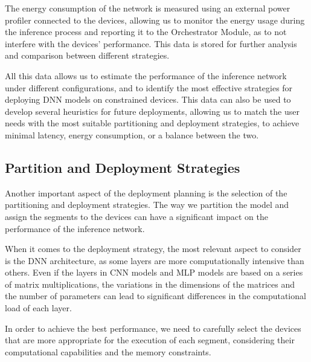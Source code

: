 The energy consumption of the network is measured using an external power profiler 
connected to the devices, allowing us to monitor the energy usage during the inference 
process and reporting it to the Orchestrator Module, as
to not interfere with the devices' performance. This data is stored for further 
analysis and comparison between different strategies.

All this data allows us to estimate the performance of the inference network under
different configurations, and to identify the most effective strategies for deploying
\ac{DNN} models on constrained devices. This data can also be used to develop several 
heuristics for future deployments, allowing us to match the user needs with the most
suitable partitioning and deployment strategies, to achieve minimal latency, energy
consumption, or a balance between the two. 


\subsection{Partition and Deployment Strategies}\label{sec:se453}


Another important aspect of the deployment planning is the selection of the
partitioning and deployment strategies. The way we partition the model and
assign the segments to the devices can have a significant impact on the performance
of the inference network.


When it comes to the deployment strategy, the most relevant aspect to consider is the
\ac{DNN} architecture, as some layers are more computationally intensive than others.
Even if the layers in \ac{CNN} models and \ac{MLP} models are based on a series of 
matrix multiplications, the variations in the dimensions of the matrices and the
number of parameters can lead to significant differences in the computational load of
each layer.

In order to achieve the best performance, we need to carefully select the devices
that are more appropriate for the execution of each segment, considering their
computational capabilities and the memory constraints. 

